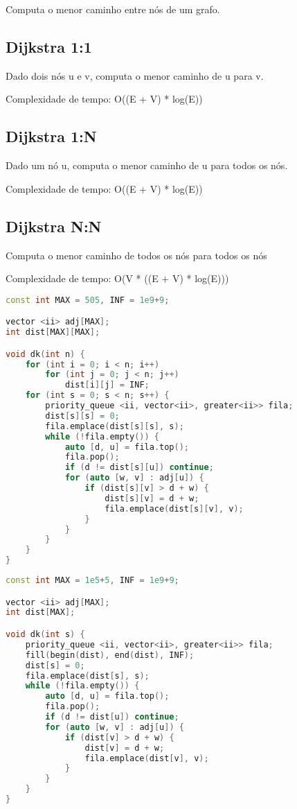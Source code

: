 \documentclass[11pt, a4paper, twoside]{article}
\begin{document}
Computa o menor caminho entre nós de um grafo.

\subsection{Dijkstra 1:1}


Dado dois nós u e v, computa o menor caminho de u para v.

Complexidade de tempo: O((E + V) * log(E))

\subsection{Dijkstra 1:N}


Dado um nó u, computa o menor caminho de u para todos os nós.

Complexidade de tempo: O((E + V) * log(E))

\subsection{Dijkstra N:N}


Computa o menor caminho de todos os nós para todos os nós

Complexidade de tempo: O(V * ((E + V) * log(E)))

\begin{lstlisting}[language=C++]
const int MAX = 505, INF = 1e9+9;

vector <ii> adj[MAX];
int dist[MAX][MAX];

void dk(int n) {
    for (int i = 0; i < n; i++)
        for (int j = 0; j < n; j++)
            dist[i][j] = INF;
    for (int s = 0; s < n; s++) {
        priority_queue <ii, vector<ii>, greater<ii>> fila;
        dist[s][s] = 0;
        fila.emplace(dist[s][s], s);
        while (!fila.empty()) {
            auto [d, u] = fila.top();
            fila.pop();
            if (d != dist[s][u]) continue;
            for (auto [w, v] : adj[u]) {
                if (dist[s][v] > d + w) {
                    dist[s][v] = d + w;
                    fila.emplace(dist[s][v], v);
                }
            }
        }
    }
}
\end{lstlisting}

\begin{multicols}{2}
\begin{lstlisting}[language=C++]
const int MAX = 1e5+5, INF = 1e9+9;

vector <ii> adj[MAX];
int dist[MAX];

void dk(int s) {
    priority_queue <ii, vector<ii>, greater<ii>> fila;
    fill(begin(dist), end(dist), INF);
    dist[s] = 0;
    fila.emplace(dist[s], s);
    while (!fila.empty()) {
        auto [d, u] = fila.top();
        fila.pop();
        if (d != dist[u]) continue;
        for (auto [w, v] : adj[u]) {
            if (dist[v] > d + w) {
                dist[v] = d + w;
                fila.emplace(dist[v], v);
            }
        }
    }
}
\end{lstlisting}
\end{multicols}
\end{document}
